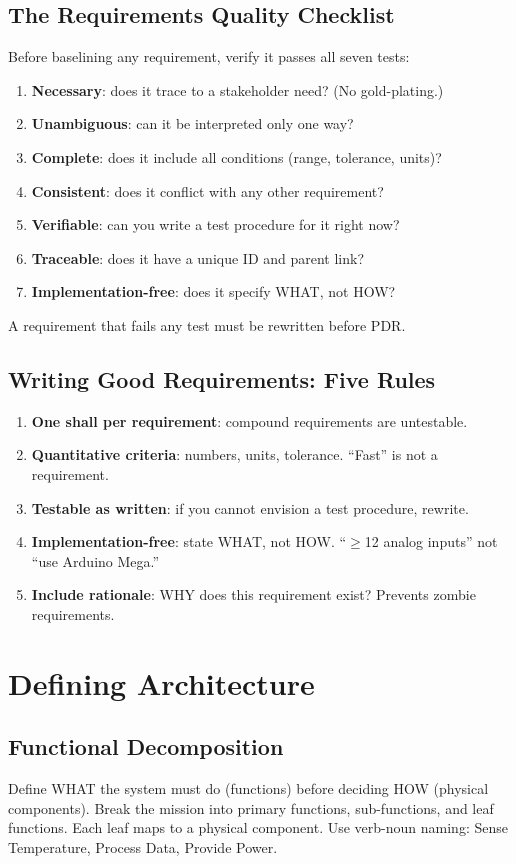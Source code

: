 \documentclass[11pt,letterpaper,twoside,openany]{book}
\begin{document}
\subsection{The Requirements Quality Checklist}
Before baselining any requirement, verify it passes all seven tests:
\begin{enumerate}[nosep,leftmargin=1.5em]
\item \textbf{Necessary}: does it trace to a stakeholder need? (No gold-plating.)
\item \textbf{Unambiguous}: can it be interpreted only one way?
\item \textbf{Complete}: does it include all conditions (range, tolerance, units)?
\item \textbf{Consistent}: does it conflict with any other requirement?
\item \textbf{Verifiable}: can you write a test procedure for it right now?
\item \textbf{Traceable}: does it have a unique ID and parent link?
\item \textbf{Implementation-free}: does it specify WHAT, not HOW?
\end{enumerate}
A requirement that fails any test must be rewritten before PDR.

\subsection{Writing Good Requirements: Five Rules}
\begin{enumerate}[leftmargin=1.5em]
\item \textbf{One shall per requirement}: compound requirements are untestable.
\item \textbf{Quantitative criteria}: numbers, units, tolerance. ``Fast'' is not a requirement.
\item \textbf{Testable as written}: if you cannot envision a test procedure, rewrite.
\item \textbf{Implementation-free}: state WHAT, not HOW. ``$\geq$12 analog inputs'' not ``use Arduino Mega.''
\item \textbf{Include rationale}: WHY does this requirement exist? Prevents zombie requirements.
\end{enumerate}

\section{Defining Architecture}
\subsection{Functional Decomposition}
Define WHAT the system must do (functions) before deciding HOW (physical components). Break the mission into primary functions, sub-functions, and leaf functions. Each leaf maps to a physical component. Use verb-noun naming: Sense Temperature, Process Data, Provide Power.
\end{document}
